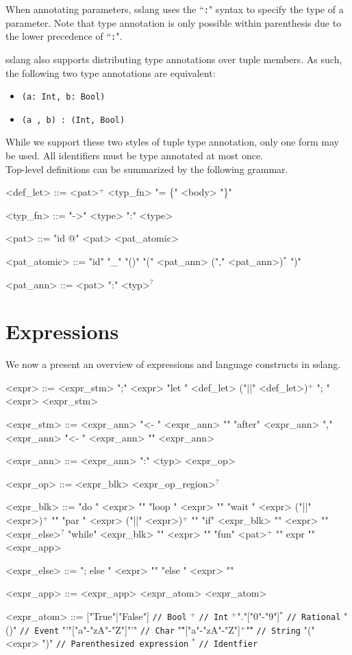 \documentclass{article}
\begin{document}
When annotating parameters, sslang uses the ``\texttt{:}" syntax to specify the type of a parameter. Note that type annotation is only possible within parenthesis due to the lower precedence of ``\texttt{:}".

sslang also supports distributing type annotations over tuple members. As such, the following two type annotations are equivalent:
\begin{itemize}
    \item \texttt{(a: Int, b: Bool)}
    \item \texttt{(a , b) : (Int, Bool)}
\end{itemize}

While we support these two styles of tuple type annotation, only one form may be used. All identifiers must be type annotated at most once. \\

Top-level definitions can be summarized by the following grammar.
\setlength{\grammarindent}{9em}
\begin{grammar}
<def_let> ::= <pat>$^{+}$ <typ_fn> "= \{" <body> "\}"

<typ_fn> ::= "->" <type>
\alt ":" <type>

<pat> ::= "id @" <pat>
\alt <pat_atomic>

<pat_atomic> ::= "id"
\alt "_"
\alt "()"
\alt "(" <pat_ann> ("," <pat_ann>)$^{*}$ ")"

<pat_ann> ::= <pat> ":" <typ>$^{?}$
\end{grammar}

\section{Expressions}
We now a present an overview of expressions and language constructs in sslang.
\begin{grammar}
<expr> ::= <expr_stm> ";" <expr>
\alt "let {" <def_let> ("||" <def_let>)$^{+}$ "}; " <expr>
\alt <expr_stm>

<expr_stm> ::= <expr_ann> "<- {"  <expr_ann> "}"
\alt "after" <expr_ann> "," <expr_ann> "<- {"  <expr_ann> "}"
\alt <expr_ann>

<expr_ann> ::= <expr_ann> ":" <typ>
\alt <expr_op>

<expr_op> ::= <expr_blk> <expr_op_region>$^{?}$

<expr_blk> ::=  "do {" <expr> "}"
\alt "loop {" <expr> "}"
\alt "wait {" <expr> ("||" <expr>)$^{+}$ "}"
\alt "par {" <expr> ("||" <expr>)$^{+}$ "}"
\alt "if" <expr_blk> "{" <expr> "}" <expr_else>$^{?}$
\alt "while" <expr_blk> "{" <expr> "}"
\alt "fun" <pat>$^{+}$ "{" expr "}"
\alt <expr_app>

<expr_else> ::= "; else {" <expr> "}"
\alt "else {" <expr> "}"

<expr_app> ::= <expr_app> <expr_atom>
\alt <expr_atom>

<expr_atom> ::= ["True"|"False"] \texttt{// Bool}
\alt ["0"-"9"]$^{+}$ \texttt{// Int}
\alt ["0"-"9"]$^{+}$"."["0"-"9"]$^{*}$ \texttt{// Rational}
\alt "()" \texttt{// Event}
\alt "'"["a"-"zA"-"Z"]"'" \texttt{// Char}
\alt "\""["a"-"zA"-"Z"]$^{+}$"\"" \texttt{// String}
\alt "(" <expr> ")" \texttt{// Parenthesized expression}
\alt ["a"-"zA"-"Z"] ["a"-"zA"-"Z0"-"9_'"]$^{*}$ \texttt{// Identfier}
\end{grammar}
\end{document}
